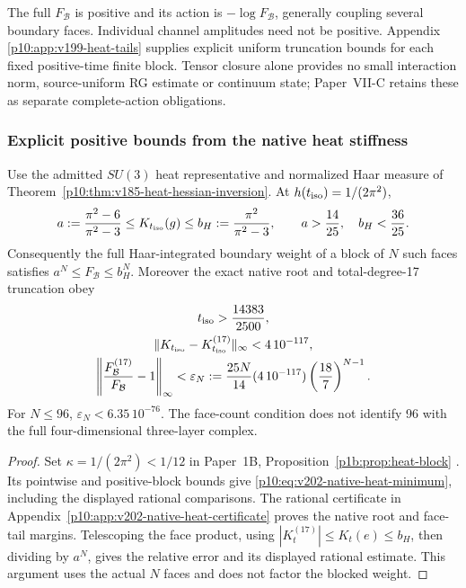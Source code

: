 \documentclass[12pt,a4paper]{article}
\begin{document}
The full \(F_{\mathcal B}\) is positive and its action is
\(-\log F_{\mathcal B}\), generally coupling several boundary faces.
Individual channel amplitudes need not be positive.  Appendix~
\ref{p10:app:v199-heat-tails} supplies explicit uniform truncation bounds for
each fixed positive-time finite block.  Tensor closure alone provides no
small interaction norm, source-uniform RG estimate or continuum state;
Paper~VII-C retains these as separate complete-action obligations.


\subsubsection{Explicit positive bounds from the native heat stiffness}
\label{p10:sec:v202-positive-heat-blocks}
\begin{theorem}
\label{p10:thm:v202-native-heat-bounds}
Use the admitted $SU(3)$ heat representative and normalized Haar measure
of Theorem~\ref{p10:thm:v185-heat-hessian-inversion}. At
$h(t_{\rm iso})=1/(2\pi^2)$,
\begin{equation}
 a:=\frac{\pi^2-6}{\pi^2-3}\le K_{t_{\rm iso}}(g)
 \le b_H:=\frac{\pi^2}{\pi^2-3},\qquad
 a>\frac{14}{25},\quad b_H<\frac{36}{25}.
 \label{p10:eq:v202-native-heat-minimum}
\end{equation}
Consequently the full Haar-integrated boundary weight of a block of $N$
such faces satisfies $a^N\le F_{\mathcal B}\le b_H^N$.
Moreover the exact native root and total-degree-17 truncation obey
\begin{equation}
\begin{gathered}
 t_{\rm iso}>\frac{14383}{2500},\\
 \|K_{t_{\rm iso}}-K_{t_{\rm iso}}^{(17)}\|_\infty<4\,10^{-117},\\
 \left\|\frac{F_{\mathcal B}^{(17)}}{F_{\mathcal B}}-1\right\|_\infty
 <\varepsilon_N:=\frac{25N}{14}(4\,10^{-117})
                  \left(\frac{18}{7}\right)^{N-1}.
\end{gathered}
 \label{p10:eq:v202-native-heat-relative-error}
\end{equation}
For $N\le96$, $\varepsilon_N<6.35\,10^{-76}$. The face-count condition
does not identify 96 with the full four-dimensional three-layer complex.
\end{theorem}
\begin{proof}
Set $\kappa=1/(2\pi^2)<1/12$ in Paper~1B,
Proposition~\ref{p1b:prop:heat-block} \cite{Kugelmann2026Paper1B}.
Its pointwise and positive-block bounds give
\eqref{p10:eq:v202-native-heat-minimum}, including the displayed
rational comparisons. The rational certificate in
Appendix~\ref{p10:app:v202-native-heat-certificate} proves the native
root and face-tail margins. Telescoping the face product, using
$|K_t^{(17)}|\le K_t(e)\le b_H$, then dividing by $a^N$, gives
the relative error and its displayed rational estimate. This argument
uses the actual $N$ faces and does not factor the blocked weight.
\end{proof}
\end{document}
